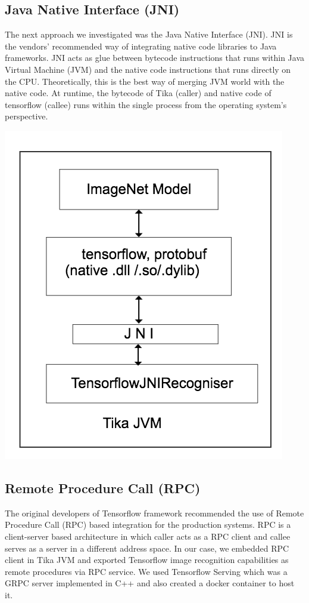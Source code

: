 \documentclass[letterpaper, 10 pt, conference]{ieeeconf}  %
\begin{document}
\subsection{Java Native Interface (JNI)} \label{sec:int-jni}
The next approach we investigated was the Java Native Interface (JNI). JNI is the vendors' recommended way of integrating native code libraries to Java frameworks\cite{}. JNI acts as glue between bytecode instructions that runs within Java Virtual Machine (JVM) and the native  code instructions that runs directly on the CPU. Theoretically, this is the best way of merging JVM world with the native code\cite{}. At runtime, the bytecode of Tika (caller) and native code of tensorflow (callee) runs within the single process from the operating system's perspective. 

\includegraphics[scale=0.40]{tika-tflow-jni-design}

\subsection{Remote Procedure Call (RPC)} \label{sec:int-rpc}
The original developers of Tensorflow framework recommended the use of Remote Procedure Call (RPC) based integration for the production systems\cite{}. RPC is a client-server based architecture in which caller acts as a RPC client and callee serves as a server in a different address space. In our case, we embedded RPC client in Tika JVM and exported Tensorflow image recognition capabilities as remote procedures via RPC service. We used Tensorflow Serving\cite{} which was a GRPC\cite{} server implemented in C++ and also created a docker container to host it.
\end{document}
